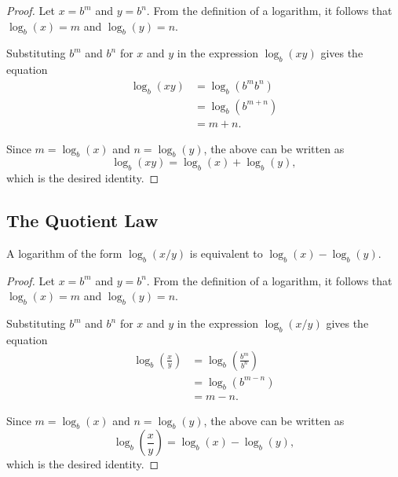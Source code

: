 \documentclass[parskip, headings=standardclasses]{scrartcl}
\begin{document}
\begin{proof}
  Let \(x = b^{m}\) and \(y = b^{n}\). From the definition of a logarithm, it
  follows that \(\log_{b}(x) = m\) and \(\log_{b}(y) = n\).

  Substituting \(b^{m}\) and \(b^{n}\) for \(x\) and \(y\) in the expression
  \(\log_{b}(xy)\) gives the equation
  \begin{equation*}
    \begin{split}
      \log_{b}(xy) &= \log_{b}(b^{m}b^{n}) \\
      &= \log_{b}(b^{m + n}) \\
      &= m + n.
    \end{split}
  \end{equation*}

  Since \(m = \log_{b}(x)\) and \(n = \log_{b}(y)\), the above can be written as
  \begin{equation*}
    \log_{b}(xy) = \log_{b}(x) + \log_{b}(y),
  \end{equation*}
  which is the desired identity.
\end{proof}

\subsection{The Quotient Law}

\begin{theorem}
  A logarithm of the form \(\log_{b}(x/y)\) is equivalent to
  \(\log_{b}(x) - \log_{b}(y)\).
\end{theorem}

\begin{proof}
  Let \(x = b^{m}\) and \(y = b^{n}\). From the definition of a logarithm, it
  follows that \(\log_{b}(x) = m\) and \(\log_{b}(y) = n\).

  Substituting \(b^{m}\) and \(b^{n}\) for \(x\) and \(y\) in the expression
  \(\log_{b}(x/y)\) gives the equation
  \begin{equation*}
    \begin{split}
      \log_{b}(\frac{x}{y}) &= \log_{b}(\frac{b^{m}}{b^{n}}) \\
      &= \log_{b}(b^{m - n}) \\
      &= m - n.
    \end{split}
  \end{equation*}

  Since \(m = \log_{b}(x)\) and \(n = \log_{b}(y)\), the above can be written as
  \begin{equation*}
    \log_{b}(\frac{x}{y}) = \log_{b}(x) - \log_{b}(y),
  \end{equation*}
  which is the desired identity.
\end{proof}
\end{document}
